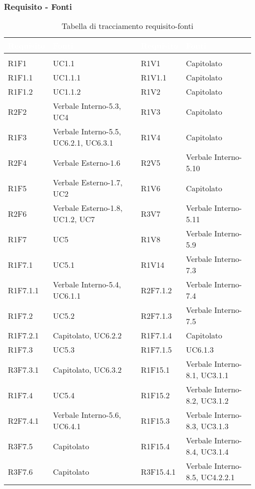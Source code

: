 \subsubsection{Requisito - Fonti}
\renewcommand{\arraystretch}{1.5}
\begin{center}
\begin{longtable}{C{2cm} | C{5cm} C{0.2cm} C{2cm} | C{5cm}}
		\textcolor{white}{\textbf{Requisito}} & 
		\textcolor{white}{\textbf{Fonti}}&
		 & 
		\textcolor{white}{\textbf{Requisito}} & 
		\textcolor{white}{\textbf{Fonti}}\\
		\endfirsthead
	    \\
	    \endfoot
	    \caption{Tabella di tracciamento requisito-fonti}
	    \endlastfoot


R1F1 & UC1.1 &  & R1V1 & Capitolato \\
R1F1.1 & UC1.1.1 &  & R1V1.1 & Capitolato \\
R1F1.2 & UC1.1.2 &  & R1V2 & Capitolato  \\
R2F2 & Verbale Interno-5.3, UC4 &  & R1V3 & Capitolato  \\
R1F3 & Verbale Interno-5.5, UC6.2.1, UC6.3.1 &  & R1V4 & Capitolato\\
R2F4 & Verbale Esterno-1.6 &  & R2V5 & Verbale Interno-5.10  \\
R1F5 & Verbale Esterno-1.7, UC2 &  & R1V6 & Capitolato \\
R2F6 & Verbale Esterno-1.8, UC1.2, UC7 &  & R3V7 & Verbale Interno-5.11  \\
R1F7 & UC5 &  & R1V8 & Verbale Interno-5.9  \\
R1F7.1 & UC5.1 &  & R1V14 & Verbale Interno-7.3\\
R1F7.1.1 & Verbale Interno-5.4, UC6.1.1 &  & R2F7.1.2 & Verbale Interno-7.4 \\
R1F7.2 & UC5.2 &  & R2F7.1.3 & Verbale Interno-7.5 \\
R1F7.2.1 & Capitolato, UC6.2.2 &  & R1F7.1.4  & Capitolato \\
R1F7.3 & UC5.3 &  & R1F7.1.5 & UC6.1.3 \\
R3F7.3.1 & Capitolato, UC6.3.2 &  & R1F15.1  & Verbale Interno-8.1, UC3.1.1 \\
R1F7.4 & UC5.4 &  & R1F15.2 & Verbale Interno-8.2, UC3.1.2 \\
R2F7.4.1 & Verbale Interno-5.6, UC6.4.1 &  & R1F15.3 & Verbale Interno-8.3, UC3.1.3 \\
R3F7.5 & Capitolato &  & R1F15.4 & Verbale Interno-8.4, UC3.1.4 \\
R3F7.6 & Capitolato &  & R3F15.4.1 & Verbale Interno-8.5, UC4.2.2.1 \\


\end{longtable}
\end{center}
